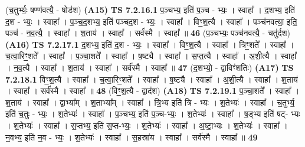 \documentclass[17pt]{extarticle}
\begin{document}
                  \newline
                      (च॒तुर्भ्यः॒ षण्ण॑वत्यै॒ - षोड॑श)  \textbf{(A15)} \newline \newline
                                \textbf{ TS 7.2.16.1} \newline
                  प॒ञ्चभ्य॒ इति॑ प॒ञ्च - भ्यः॒ । स्वाहा᳚ । द॒शभ्य॒ इति॑ द॒श - भ्यः॒ । स्वाहा᳚ । प॒ञ्च॒द॒शभ्य॒ इति॑ पञ्चद॒श - भ्यः॒ । स्वाहा᳚ । विꣳ॒॒श॒त्यै । स्वाहा᳚ । पञ्च॑नवत्या॒ इति॒ पञ्च॑ - न॒व॒त्यै॒ । स्वाहा᳚ । श॒ताय॑ । स्वाहा᳚ । सर्व॑स्मै । स्वाहा᳚ ॥ \textbf{  46} \newline
                  \newline
                      (प॒ञ्चभ्यः॒ पञ्च॑नवत्यै॒ - चतु॑र्दश)  \textbf{(A16)} \newline \newline
                                \textbf{ TS 7.2.17.1} \newline
                  द॒शभ्य॒ इति॑ द॒श - भ्यः॒ । स्वाहा᳚ । विꣳ॒॒श॒त्यै । स्वाहा᳚ । त्रिꣳ॒॒शते᳚ । स्वाहा᳚ । च॒त्वा॒रिꣳ॒॒शते᳚ । स्वाहा᳚ । प॒ञ्चा॒शते᳚ । स्वाहा᳚ । ष॒ष्ट्यै । स्वाहा᳚ । स॒प्त॒त्यै । स्वाहा᳚ । अ॒शी॒त्यै । स्वाहा᳚ । न॒व॒त्यै । स्वाहा᳚ । श॒ताय॑ । स्वाहा᳚ । सर्व॑स्मै । स्वाहा᳚ ॥ \textbf{  47} \newline
                  \newline
                      (द॒शभ्यो॒ - द्वाविꣳ॑शतिः)  \textbf{(A17)} \newline \newline
                                \textbf{ TS 7.2.18.1} \newline
                  विꣳ॒॒श॒त्यै । स्वाहा᳚ । च॒त्वा॒रिꣳ॒॒शते᳚ । स्वाहा᳚ । ष॒ष्ट्यै । स्वाहा᳚ । अ॒शी॒त्यै । स्वाहा᳚ । श॒ताय॑ । स्वाहा᳚ । सर्व॑स्मै । स्वाहा᳚ ॥ \textbf{  48} \newline
                  \newline
                      (विꣳ॒॒श॒त्यै - द्वाद॑श)  \textbf{(A18)} \newline \newline
                                \textbf{ TS 7.2.19.1} \newline
                  प॒ञ्चा॒शते᳚ । स्वाहा᳚ । श॒ताय॑ । स्वाहा᳚ । द्वाभ्या᳚म् । श॒ताभ्या᳚म् । स्वाहा᳚ । त्रि॒भ्य इति॑ त्रि - भ्यः । श॒तेभ्यः॑ । स्वाहा᳚ । च॒तुर्भ्य॒ इति॑ च॒तुः - भ्यः॒ । श॒तेभ्यः॑ । स्वाहा᳚ । प॒ञ्चभ्य॒ इति॑ प॒ञ्च-भ्यः॒ । श॒तेभ्यः॑ । स्वाहा᳚ । ष॒ड्भ्य इति॑ षट्- भ्यः । श॒तेभ्यः॑ । स्वाहा᳚ । स॒प्तभ्य॒ इति॑ स॒प्त-भ्यः॒ । श॒तेभ्यः॑ । स्वाहा᳚ । अ॒ष्टा॒भ्यः । श॒तेभ्यः॑ । स्वाहा᳚ । न॒वभ्य॒ इति॑ न॒व - भ्यः॒ । श॒तेभ्यः॑ । स्वाहा᳚ । स॒हस्रा॑य । स्वाहा᳚ । सर्व॑स्मै । स्वाहा᳚ ॥ \textbf{  49 } \newline
\end{document}
